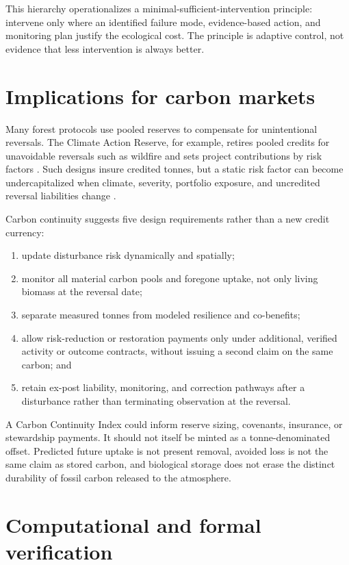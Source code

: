 \documentclass[10pt]{article}
\begin{document}
This hierarchy operationalizes a minimal-sufficient-intervention principle:
intervene only where an identified failure mode, evidence-based action, and
monitoring plan justify the ecological cost.  The principle is adaptive control,
not evidence that less intervention is always better.

\section{Implications for carbon markets}

Many forest protocols use pooled reserves to compensate for unintentional
reversals.  The Climate Action Reserve, for example, retires pooled credits for
unavoidable reversals such as wildfire and sets project contributions by risk
factors \cite{car2025}.  Such designs insure credited tonnes, but a static risk
factor can become undercapitalized when climate, severity, portfolio exposure,
and uncredited reversal liabilities change \cite{badgley2022,wu2026}.

Carbon continuity suggests five design requirements rather than a new credit
currency:

\begin{enumerate}
\item update disturbance risk dynamically and spatially;
\item monitor all material carbon pools and foregone uptake, not only living
biomass at the reversal date;
\item separate measured tonnes from modeled resilience and co-benefits;
\item allow risk-reduction or restoration payments only under additional,
verified activity or outcome contracts, without issuing a second claim on the
same carbon; and
\item retain ex-post liability, monitoring, and correction pathways after a
disturbance rather than terminating observation at the reversal.
\end{enumerate}

A Carbon Continuity Index could inform reserve sizing, covenants, insurance,
or stewardship payments.  It should not itself be minted as a tonne-denominated
offset.  Predicted future uptake is not present removal, avoided loss is not the
same claim as stored carbon, and biological storage does not erase the distinct
durability of fossil carbon released to the atmosphere.

\section{Computational and formal verification}
\end{document}
